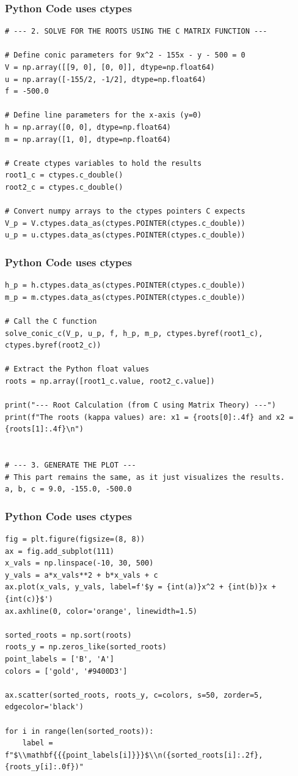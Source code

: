 \documentclass{beamer}
\begin{document}
\begin{frame}[fragile]
\frametitle{Python Code uses ctypes}
\begin{lstlisting}
# --- 2. SOLVE FOR THE ROOTS USING THE C MATRIX FUNCTION ---

# Define conic parameters for 9x^2 - 155x - y - 500 = 0
V = np.array([[9, 0], [0, 0]], dtype=np.float64)
u = np.array([-155/2, -1/2], dtype=np.float64)
f = -500.0

# Define line parameters for the x-axis (y=0)
h = np.array([0, 0], dtype=np.float64)
m = np.array([1, 0], dtype=np.float64)

# Create ctypes variables to hold the results
root1_c = ctypes.c_double()
root2_c = ctypes.c_double()

# Convert numpy arrays to the ctypes pointers C expects
V_p = V.ctypes.data_as(ctypes.POINTER(ctypes.c_double))
u_p = u.ctypes.data_as(ctypes.POINTER(ctypes.c_double))
\end{lstlisting}
\end{frame}
\begin{frame}[fragile]
\frametitle{Python Code uses ctypes}
\begin{lstlisting}
h_p = h.ctypes.data_as(ctypes.POINTER(ctypes.c_double))
m_p = m.ctypes.data_as(ctypes.POINTER(ctypes.c_double))

# Call the C function
solve_conic_c(V_p, u_p, f, h_p, m_p, ctypes.byref(root1_c), ctypes.byref(root2_c))

# Extract the Python float values
roots = np.array([root1_c.value, root2_c.value])

print("--- Root Calculation (from C using Matrix Theory) ---")
print(f"The roots (kappa values) are: x1 = {roots[0]:.4f} and x2 = {roots[1]:.4f}\n")


# --- 3. GENERATE THE PLOT ---
# This part remains the same, as it just visualizes the results.
a, b, c = 9.0, -155.0, -500.0
\end{lstlisting}
\end{frame}
\begin{frame}[fragile]
\frametitle{Python Code uses ctypes}
\begin{lstlisting}
fig = plt.figure(figsize=(8, 8))
ax = fig.add_subplot(111)
x_vals = np.linspace(-10, 30, 500)
y_vals = a*x_vals**2 + b*x_vals + c
ax.plot(x_vals, y_vals, label=f'$y = {int(a)}x^2 + {int(b)}x + {int(c)}$')
ax.axhline(0, color='orange', linewidth=1.5)

sorted_roots = np.sort(roots)
roots_y = np.zeros_like(sorted_roots)
point_labels = ['B', 'A']
colors = ['gold', '#9400D3']

ax.scatter(sorted_roots, roots_y, c=colors, s=50, zorder=5, edgecolor='black')

for i in range(len(sorted_roots)):
    label = f"$\\mathbf{{{point_labels[i]}}}$\\n({sorted_roots[i]:.2f}, {roots_y[i]:.0f})"
    \end{lstlisting}
\end{frame}
\end{document}
